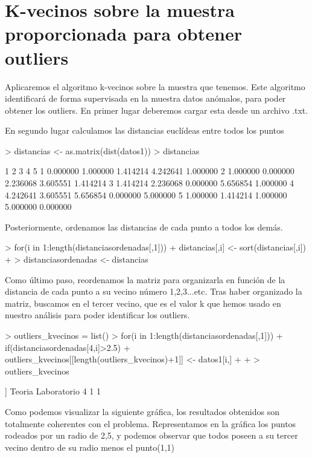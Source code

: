 \documentclass [a4paper] {article}
\begin{document}
\newpage
\section{K-vecinos sobre la muestra proporcionada para obtener outliers}

Aplicaremos el algoritmo k-vecinos sobre la muestra que tenemos.
Este algoritmo identificará de forma supervisada en la muestra datos anómalos, para poder obtener los outliers.
En primer lugar deberemos cargar esta desde un archivo .txt.


En segundo lugar calculamos las distancias euclídeas entre todos los puntos
\begin{Schunk}
\begin{Sinput}
> distancias <- as.matrix(dist(datos1))
> distancias
\end{Sinput}
\begin{Soutput}
         1        2        3        4        5
1 0.000000 1.000000 1.414214 4.242641 1.000000
2 1.000000 0.000000 2.236068 3.605551 1.414214
3 1.414214 2.236068 0.000000 5.656854 1.000000
4 4.242641 3.605551 5.656854 0.000000 5.000000
5 1.000000 1.414214 1.000000 5.000000 0.000000
\end{Soutput}
\end{Schunk}

Posteriormente, ordenamos las distancias de cada punto a todos los demás.
\begin{Schunk}
\begin{Sinput}
> for(i in 1:length(distanciasordenadas[,1])){
+   distancias[,i] <- sort(distancias[,i])
+ }
> distanciasordenadas <- distancias
\end{Sinput}
\end{Schunk}

Como último paso, reordenamos la matriz para organizarla en función de la distancia
de cada punto a su vecino número 1,2,3...etc. Tras haber organizado la matriz, buscamos en el tercer
vecino, que es el valor k que hemos usado en nuestro análisis para poder identificar los outliers.
\begin{Schunk}
\begin{Sinput}
> outliers_kvecinos = list()
> for(i in 1:length(distanciasordenadas[,1])){
+   if(distanciasordenadas[4,i]>2.5){
+     outliers_kvecinos[[length(outliers_kvecinos)+1]] <- datos1[i,]
+   }
+ }
> outliers_kvecinos
\end{Sinput}
\begin{Soutput}
[[1]]
  Teoria Laboratorio
4      1           1
\end{Soutput}
\end{Schunk}
Como podemos visualizar la siguiente gráfica, los resultados obtenidos son totalmente coherentes con el problema.
Representamos en la gráfica los puntos rodeados por un radio de 2,5, y podemos observar que todos poseen a su tercer vecino
dentro de su radio menos el punto(1,1)
\end{document}
